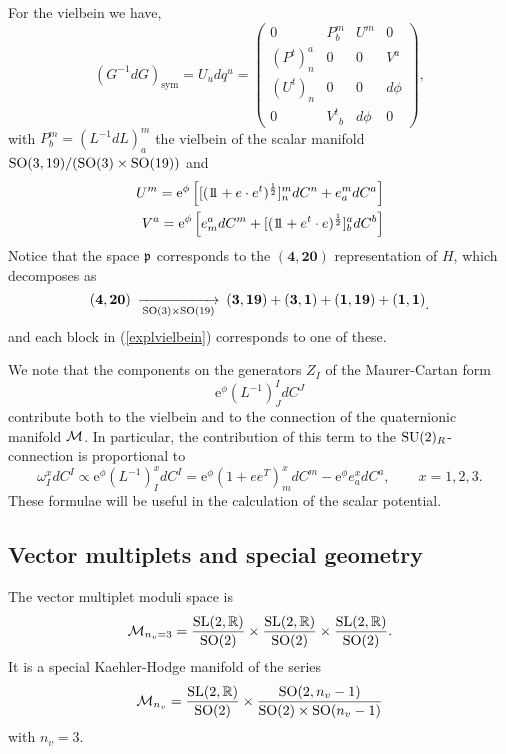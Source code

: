 \documentclass[a4paper,12pt]{article}
\begin{document}
For the vielbein we have,
\begin{equation}
(G^{-1}dG)_{\mathrm{sym}} =U_udq^u=\begin{pmatrix} 0&P^m_b&U^m&0\\
(P^t)^a_n&0&0&V^a\\
({U^t})_n&0&0&d\phi\\
0&{V^t}_b&d\phi&0\end{pmatrix},\label{explvielbein}
\end{equation}
with $P^m_b = \left(L^{-1} dL\right) ^m_a$ the vielbein of the
scalar manifold ${\mathrm{SO}(3,19)}/({\mathrm{SO}(3) \times \mathrm{SO}(19)})$ and
\begin{eqnarray}
 U^m=\mathrm{e}^\phi\left[ [(\relax{\rm 1\kern-.28em 1} + e\cdot e^t)^{\frac 12}]^m_n
dC^n
+ e^m_a dC^a \right] \label{um}\\
V^a=\mathrm{e}^\phi\left[ e^a_m dC^m + [(\relax{\rm 1\kern-.28em 1} + e^t\cdot e)^{\frac
12}]^a_b dC^b \right]
\end{eqnarray}
Notice that the space $\mathfrak{p}$ corresponds to the $(\mathbf{4,20})$
representation of $H$, which decomposes as
$$\begin{CD}(\mathbf{4,20})@>>\rSO(3)\times \rSO(19)>(\mathbf{3,19})+(\mathbf{3,1})+(\mathbf{1, 19})+ (\mathbf{1, 1})\end{CD}.$$
and each block in (\ref{explvielbein}) corresponds to one of
these.

\bigskip

We note  that the components on the generators $Z_I$ of the
Maurer-Cartan form $$\mathrm{e}^\phi (L^{-1})^I_JdC^J$$ contribute
both to the vielbein and to the connection of the quaternionic
manifold $\mathcal{M}$. In particular, the contribution of this term to
the $\mathrm{SU}(2)_R$-connection is proportional to
\begin{equation}\omega_I^xdC^I\propto \mathrm{e}^\phi
(L^{-1})_I^xdC^I=\mathrm{e}^\phi(1+ee^T)_m^xdC^m-\mathrm{e}^\phi
e_a^xdC^a, \qquad x=1,2,3. \label{omega} \end{equation}
 These
formulae will be useful in the calculation of the scalar
potential.



\subsection{\label{vectormultiplets}Vector multiplets and special geometry}
The vector multiplet moduli space is
$$\mathcal{M}_{n_v=3}=\frac {\mathrm{SL}(2,\mathbb{R})}{\mathrm{SO}(2)}\times \frac
{\mathrm{SL}(2,\mathbb{R})}{\mathrm{SO}(2)}\times \frac {\mathrm{SL}(2,\mathbb{R})}{\mathrm{SO}(2)}.$$ It is a
special Kaehler-Hodge manifold of the series \cite{ckpdfwg,cp}
$$\mathcal{M}_{n_v}=\frac {\mathrm{SL}(2,\mathbb{R})}{\mathrm{SO}(2)}\times \frac
{\mathrm{SO}(2,n_v-1)}{\mathrm{SO}(2)\times \mathrm{SO}(n_v-1)}$$ with $n_v=3$.
\end{document}
